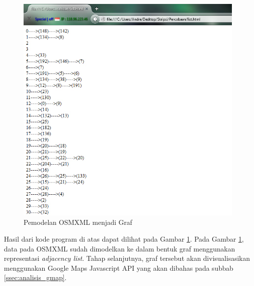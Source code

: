 \begin{figure}[h]
\centering
\includegraphics[scale=0.5]{Gambar/graf_analisis}
\caption[Pemodelan OSMXML menjadi Graf]{Pemodelan OSMXML menjadi Graf}
\label{fig:graf_analisis}
\end{figure}
Hasil dari kode program di atas dapat dilihat pada Gambar
\ref{fig:graf_analisis}.
Pada Gambar \ref{fig:graf_analisis}, data pada OSMXML sudah dimodelkan ke dalam
bentuk graf menggunakan representasi \textit{adjacency list}. Tahap
selanjutnya, graf tersebut akan divisualisasikan menggunakan Google Maps
Javascript API yang akan dibahas pada subbab \ref{ssec:analisis_gmap}.

